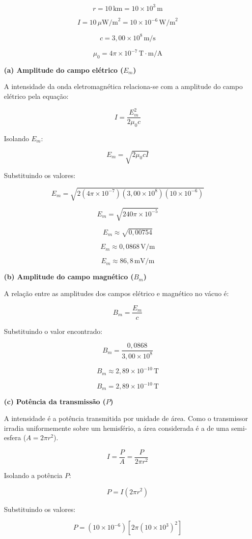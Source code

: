 \documentclass[12pt,a4paper]{article}
\begin{document}
\[
r = 10\,\text{km} = 10 \times 10^3\,\text{m}
\]

\[
I = 10\,\mu\text{W/m}^2 = 10 \times 10^{-6}\,\text{W/m}^2
\]

\[
c = 3,00 \times 10^8\,\text{m/s}
\]

\[
\mu_0 = 4\pi \times 10^{-7}\,\text{T}\cdot\text{m/A}
\]

\textbf{(a) Amplitude do campo elétrico (\(E_m\))}

A intensidade da onda eletromagnética relaciona-se com a amplitude do campo elétrico pela equação:

\[
I = \frac{E_m^2}{2 \mu_0 c}
\]

Isolando \(E_m\):

\[
E_m = \sqrt{2 \mu_0 c I}
\]

Substituindo os valores:

\[
E_m = \sqrt{2 (4\pi \times 10^{-7}) (3,00 \times 10^8) (10 \times 10^{-6})}
\]

\[
E_m = \sqrt{240\pi \times 10^{-5}}
\]

\[
E_m \approx \sqrt{0,00754}
\]

\[
E_m \approx 0,0868\,\text{V/m}
\]

\[
\boxed{E_m \approx 86,8\,\text{mV/m}}
\]

\textbf{(b) Amplitude do campo magnético (\(B_m\))}

A relação entre as amplitudes dos campos elétrico e magnético no vácuo é:

\[
B_m = \frac{E_m}{c}
\]

Substituindo o valor encontrado:

\[
B_m = \frac{0,0868}{3,00 \times 10^8}
\]

\[
B_m \approx 2,89 \times 10^{-10}\,\text{T}
\]

\[
\boxed{B_m = 2,89 \times 10^{-10}\,\text{T}}
\]

\textbf{(c) Potência da transmissão (\(P\))}

A intensidade é a potência transmitida por unidade de área. Como o transmissor irradia uniformemente sobre um hemisfério, a área considerada é a de uma semi-esfera (\(A = 2\pi r^2\)).

\[
I = \frac{P}{A} = \frac{P}{2\pi r^2}
\]

Isolando a potência \(P\):

\[
P = I (2\pi r^2)
\]

Substituindo os valores:

\[
P = (10 \times 10^{-6}) [2\pi (10 \times 10^3)^2]
\]
\end{document}
